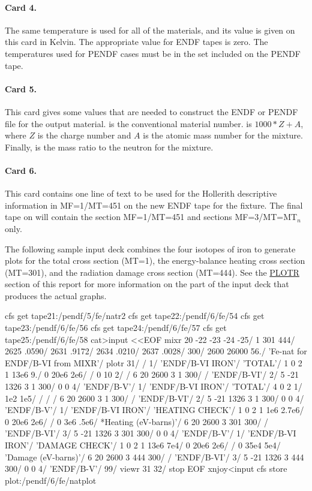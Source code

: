 \paragraph{Card 4.}
The same temperature is used for all of
the materials, and its value is given on this card in Kelvin.  The
appropriate value for ENDF tapes is zero.  The temperatures used
for PENDF cases must be in the set included on the PENDF tape.

\paragraph{Card 5.}
This card gives some values that are
needed to construct the ENDF or PENDF file for the output material.
 is the conventional material number.  
is $1000*Z+A$, where $Z$ is the charge number and $A$ is the atomic
mass number for the mixture.  Finally,  is the mass ratio
to the neutron for the mixture.

\paragraph{Card 6.}  This card contains one line of text to be
used for the Hollerith descriptive information in MF=1/MT=451
on the new ENDF tape for the fixture.  The final tape on
 will contain the section MF=1/MT=451 and sections
MF=3/MT=MT$_n$ only.

\vspace{6.0 pt}
The following sample input deck combines the four isotopes of iron
to generate plots for the total cross section (MT=1), the
energy-balance heating cross section (MT=301), and the
radiation damage cross section (MT=444).  See the
\hyperlink{sPLOTRhy}{PLOTR}
section of this report for more information on the part of
the input deck that produces the actual graphs.

\small
\begin{ccode}

cfs get tape21:/pendf/5/fe/natr2
cfs get tape22:/pendf/6/fe/54
cfs get tape23:/pendf/6/fe/56
cfs get tape24:/pendf/6/fe/57
cfs get tape25:/pendf/6/fe/58
cat>input <<EOF
 mixr
 20 -22 -23 -24 -25/
 1 301 444/
 2625 .0590/
 2631 .9172/
 2634 .0210/
 2637 .0028/
 300/
 2600 26000 56./
 'Fe-nat for ENDF/B-VI from MIXR'/
 plotr
 31/
 /
 1/
 'ENDF/B-VI IRON'/
 'TOTAL'/
 1 0 2 1 13e6 9./
 0 20e6 2e6/
 /
 0 10 2/
 /
 6 20 2600 3 1 300/
 /
 'ENDF/B-VI'/
 2/
 5 -21 1326 3 1 300/
 0 0 4/
 'ENDF/B-V'/
 1/
 'ENDF/B-VI IRON'/
 'TOTAL'/
 4 0 2 1/
 1e2 1e5/
 /
 /
 /
 6 20 2600 3 1 300/
 /
 'ENDF/B-VI'/
 2/
 5 -21 1326 3 1 300/
 0 0 4/
 'ENDF/B-V'/
 1/
 'ENDF/B-VI IRON'/
 'HEATING CHECK'/
 1 0 2 1 1e6 2.7e6/
 0 20e6 2e6/
 /
 0 3e6 .5e6/
 *Heating (eV-barns)'/
 6 20 2600 3 301 300/
 /
 'ENDF/B-VI'/
 3/
 5 -21 1326 3 301 300/
 0 0 4/
 'ENDF/B-V'/
 1/
 'ENDF/B-VI IRON'/
 'DAMAGE CHECK'/
 1 0 2 1 13e6 7e4/
 0 20e6 2e6/
 /
 0 35e4 5e4/
 'Damage (eV-barns)'/
 6 20 2600 3 444 300/
 /
 'ENDF/B-VI'/
 3/
 5 -21 1326 3 444 300/
 0 0 4/
 'ENDF/B-V'/
 99/
 viewr
 31 32/
 stop
EOF
xnjoy<input
cfs store  plot:/pendf/6/fe/natplot

\end{ccode}
\normalsize


